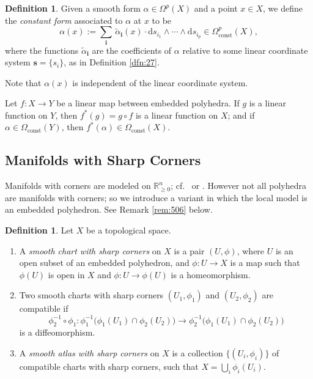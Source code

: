\documentclass[10pt, a4paper]{amsart}
\theoremstyle{definition}
\newtheorem{dfn}[equation]{Definition}
\numberwithin{equation}{section}
\newcommand{\mrm}[1]{\mathrm{#1}}
\newcommand{\mbb}[1]{\mathbb{#1}}
\newcommand{\bsym}[1]{\boldsymbol{#1}}
\newcommand{\til}[1]{\tilde{#1}}
\newcommand{\R}{\mbb{R}}
\renewcommand{\d}{\mrm{d}}
\begin{document}
\begin{dfn} \label{dfn:26}
Given a smooth form $\alpha \in \Omega^p(X)$ and a point 
$x \in X$, we define the {\em constant form} associated to $\alpha$ at $x$ to be
\[ \alpha(x) := \sum_{\bsym{i}} \, 
\til{\alpha}_{\bsym{i}}(x) \cdot \d s_{i_1} \wedge \cdots \wedge \d s_{i_p}
\in \Omega^p_{\mrm{const}}(X) , \]
where the functions $\til{\alpha}_{\bsym{i}}$ are the coefficients of $\alpha$
relative to some  linear coordinate system 
$\bsym{s} = \{ s_i \}$, as in 
Definition \ref{dfn:27}. 
\end{dfn}

Note that $\alpha(x)$ is independent of the linear coordinate system.

Let $f : X \to Y$ be a linear map between embedded polyhedra. If $g$ is a linear
function on $Y$, then 
$f^*(g) = g \circ f$ is a linear function on $X$; and if 
$\alpha \in \Omega_{\mrm{const}}(Y)$, then 
$f^*(\alpha) \in \Omega_{\mrm{const}}(X)$.

\subsection{Manifolds with Sharp Corners} \label{subsec:mfld-corners}
Manifolds with corners are modeled on 
$\R_{\geq 0}^n$; cf.\ \cite {Le} or \cite{Jo}. 
However not all polyhedra are manifolds with corners; so we introduce a variant
in which the local model is an embedded polyhedron.
See Remark \ref{rem:506} below. 

\begin{dfn} \label{dfn:510}
Let $X$ be a topological space. 
\begin{enumerate}
\item A {\em smooth chart with sharp corners} on $X$
is a pair $(U, \phi)$, where $U$ is an open subset of an embedded polyhedron,
and $\phi : U \to X$ is a map such that $\phi(U)$ is open in $X$ and 
$\phi : U \to \phi(U)$ is a homeomorphism. 

\item Two smooth charts with sharp corners $(U_1, \phi_1)$ and $(U_2, \phi_2)$
are compatible if 
\[ \phi_2^{-1} \circ \phi_1 : \phi_1^{-1} 
\bigl( \phi_1(U_1) \cap \phi_2(U_2) \bigr) \to 
\phi_2^{-1} \bigl( \phi_1(U_1) \cap \phi_2(U_2) \bigr) \]
is a diffeomorphism.

\item A {\em smooth atlas with sharp corners} on $X$ is a collection 
$\{ (U_i, \phi_i) \}$ of compatible charts with sharp corners, such that 
$X = \bigcup_i \phi_i(U_i)$.
\end{enumerate}
\end{dfn}
\end{document}
